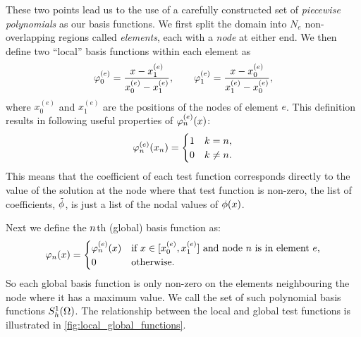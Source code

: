 These two points lead us to the use of a carefully constructed set of \emph{piecewise polynomials} as our basis functions.
We first split the domain into $N_e$ non-overlapping regions called \emph{elements}, each with a \emph{node} at either end.
We then define two ``local'' basis functions within each element as
\begin{equation}
  \varphi^{(e)}_{0}=\dfrac{x-x^{(e)}_{1}}{x^{(e)}_{0}-x^{(e)}_{1}},\qquad
  \varphi^{(e)}_{1}=\dfrac{x-x^{(e)}_{0}}{x^{(e)}_{1}-x^{(e)}_{0}},
  \label{eq:simple_lagrange}
\end{equation}
where $x^{(e)}_0$ and $x^{(e)}_1$ are the positions of the nodes of element $e$.
This definition results in following useful properties of $\varphi^{(e)}_{n}(x)$:
\begin{equation}
  \label{eq:35}
  \varphi^{(e)}_{n}(x_{n}) =
  \begin{cases}
    1 & k = n, \\
    0 & k \neq n.
  \end{cases}
\end{equation}
This means that the coefficient of each test function corresponds directly to the value of the solution at the node where that test function is non-zero, \ie the list of coefficients, $\tilde{\phi}$, is just a list of the nodal values of $\phi(x)$.

Next we define the $n$th (global) basis function as:
\begin{equation}
  \label{eq:33}
  \varphi_n(x) =
  \begin{cases}
    \varphi_n^{(e)}(x) & \text{if $x \in [x^{(e)}_0, x^{(e)}_1]$ and node $n$ is in element $e$,} \\
    0 & \text{otherwise.}
  \end{cases}
\end{equation}
So each global basis function is only non-zero on the elements neighbouring the node where it has a maximum value.
We call the set of such polynomial basis functions ${S_h^1(\Omega)}$.
The relationship between the local and global test functions is illustrated in \cref{fig:local_global_functions}.  

